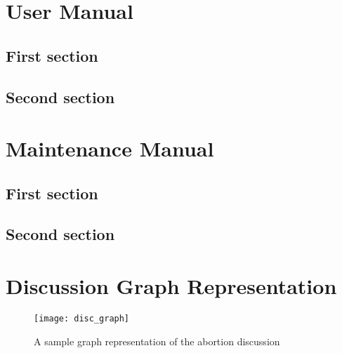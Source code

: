 \begin{appendices}
    \makeatletter
    \makeatother

    \chapter{User Manual}
      \section{First section}
      \section{Second section}

    \chapter{Maintenance Manual\label{app:maintain}}
      \section{First section}
      \section{Second section}

    \chapter{Discussion Graph Representation\label{app:disc_graph}}
      \begin{figure}[h]
        \caption{A sample graph representation of the abortion discussion}
        \centering
        \texttt{[image: disc\_graph]}
      \end{figure}
\end{appendices}
